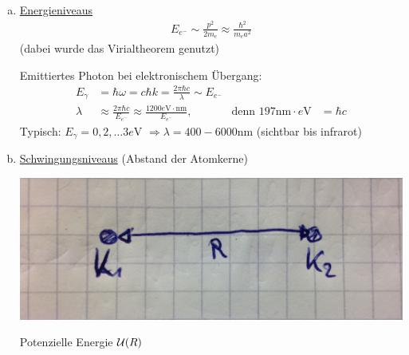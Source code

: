 	\begin{enumerate}[(a)]
	\item \underline{Energieniveaus}
			\begin{align*}
				E_{e^-} \sim \frac{p^2}{2m_e} \approx \frac{\hbar^2}{m_e a^2}
			\end{align*}
		(dabei wurde das Virialtheorem genutzt)
		
		Emittiertes Photon bei elektronischem Übergang:
			\begin{align*}
				E_\gamma &= \hbar \omega = c \hbar k = \frac{2 \pi \hbar c}{\lambda}
				\sim E_{e^-} \\
				\lambda &\approx \frac{2 \pi \hbar c}{E_{e^-}} \approx \frac{1200 e\mathrm{V} \cdot \mathrm{nm}}{E_{e^-}} ,&
				\text{denn } 197 \mathrm{nm}\cdot e\mathrm{V} &= \hbar c
			\end{align*}
		Typisch: $E_\gamma = 0, 2, \ldots 3 e$V $\Rightarrow \lambda = 400-6000$nm (sichtbar bis infrarot)
	\item \underline{Schwingungsniveaus} (Abstand der Atomkerne)
	
		\begin{minipage}{0.5\textwidth}
					\includegraphics[width=\textwidth]{Born-Oppenh_Approx1}
		\end{minipage}
		\hfill
		\begin{minipage}[c]{0.4\textwidth}
			Potenzielle Energie $\mathcal{U} (R)$
		\end{minipage}	
		

\end{enumerate}
